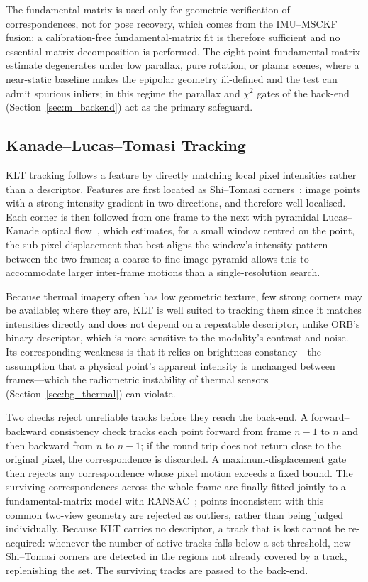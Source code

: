 The fundamental matrix is used only for geometric verification of correspondences, not for pose recovery, which comes from the IMU--MSCKF fusion; a calibration-free fundamental-matrix fit is therefore sufficient and no essential-matrix decomposition is performed. The eight-point fundamental-matrix estimate degenerates under low parallax, pure rotation, or planar scenes, where a near-static baseline makes the epipolar geometry ill-defined and the test can admit spurious inliers; in this regime the parallax and $\chi^2$ gates of the back-end (Section~\ref{sec:m_backend}) act as the primary safeguard.

\subsection{Kanade--Lucas--Tomasi Tracking}
\label{sec:m_klt}
KLT tracking follows a feature by directly matching local pixel intensities rather than a descriptor. Features are first located as Shi--Tomasi corners~\cite{Shi_1994}: image points with a strong intensity gradient in two directions, and therefore well localised. Each corner is then followed from one frame to the next with pyramidal Lucas--Kanade optical flow~\cite{Lucas_1981}, which estimates, for a small window centred on the point, the sub-pixel displacement that best aligns the window's intensity pattern between the two frames; a coarse-to-fine image pyramid allows this to accommodate larger inter-frame motions than a single-resolution search.

Because thermal imagery often has low geometric texture, few strong corners may be available; where they are, KLT is well suited to tracking them since it matches intensities directly and does not depend on a repeatable descriptor, unlike ORB's binary descriptor, which is more sensitive to the modality's contrast and noise. Its corresponding weakness is that it relies on brightness constancy---the assumption that a physical point's apparent intensity is unchanged between frames---which the radiometric instability of thermal sensors (Section~\ref{sec:bg_thermal}) can violate.

Two checks reject unreliable tracks before they reach the back-end. A forward--backward consistency check tracks each point forward from frame $n-1$ to $n$ and then backward from $n$ to $n-1$; if the round trip does not return close to the original pixel, the correspondence is discarded. A maximum-displacement gate then rejects any correspondence whose pixel motion exceeds a fixed bound. The surviving correspondences across the whole frame are finally fitted jointly to a fundamental-matrix model with RANSAC~\cite{Fischler_1981}; points inconsistent with this common two-view geometry are rejected as outliers, rather than being judged individually. Because KLT carries no descriptor, a track that is lost cannot be re-acquired: whenever the number of active tracks falls below a set threshold, new Shi--Tomasi corners are detected in the regions not already covered by a track, replenishing the set. The surviving tracks are passed to the back-end.

